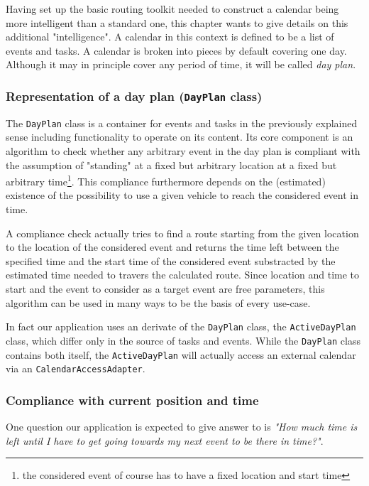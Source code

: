 Having set up the basic routing toolkit needed to construct a calendar being more intelligent than a standard one, this chapter wants to give details on this additional "intelligence". A calendar in this context is defined to be a list of events and tasks. A calendar is broken into pieces by default covering one day. Although it may in principle cover any period of time, it will be called \emph{day plan}.

\subsubsection{Representation of a day plan (\texttt{DayPlan} class)}

The \texttt{DayPlan} class is a container for events and tasks in the previously explained sense including functionality to operate on its content. Its core component is an algorithm to check whether any arbitrary event in the day plan is compliant with the assumption of "standing" at a fixed but arbitrary location at a fixed but arbitrary time\footnote{the considered event of course has to have a fixed location and start time}. This compliance furthermore depends on the (estimated) existence of the possibility to use a given vehicle to reach the considered event in time.\newline

A compliance check actually tries to find a route starting from the given location to the location of the considered event and returns the time left between the specified time and the start time of the considered event substracted by the estimated time needed to travers the calculated route. Since location and time to start and the event to consider as a target event are free parameters, this algorithm can be used in many ways to be the basis of every use-case.\newline

In fact our application uses an derivate of the \texttt{DayPlan} class, the \texttt{ActiveDayPlan} class, which differ only in the source of tasks and events. While the \texttt{DayPlan} class contains both itself, the \texttt{ActiveDayPlan} will actually access an external calendar via an \texttt{CalendarAccessAdapter}.

\subsubsection{Compliance with current position and time}
 
One question our application is expected to give answer to is \emph{"How much time is left until I have to get going towards my next event to be there in time?"}.\newline

